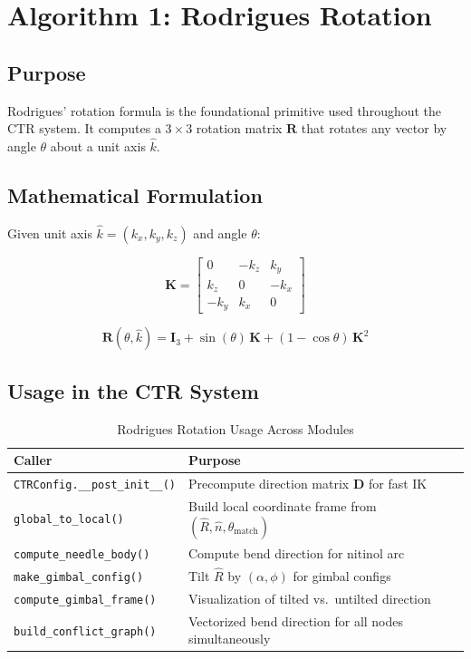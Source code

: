 \documentclass[11pt,a4paper]{article}
\newcommand{\funcname}[1]{\texttt{\textcolor{codepurple}{#1}}}
\begin{document}
\section{Algorithm 1: Rodrigues Rotation}
\label{sec:rodrigues}

\subsection{Purpose}

Rodrigues' rotation formula is the foundational primitive used throughout the CTR system. It computes a $3 \times 3$ rotation matrix $\mathbf{R}$ that rotates any vector by angle $\theta$ about a unit axis $\hat{k}$.

\subsection{Mathematical Formulation}

Given unit axis $\hat{k} = (k_x, k_y, k_z)$ and angle $\theta$:

\[
\mathbf{K} = \begin{bmatrix} 0 & -k_z & k_y \\ k_z & 0 & -k_x \\ -k_y & k_x & 0 \end{bmatrix}
\]

\[
\mathbf{R}(\theta, \hat{k}) = \mathbf{I}_3 + \sin(\theta)\,\mathbf{K} + (1 - \cos\theta)\,\mathbf{K}^2
\]

\subsection{Usage in the CTR System}

\begin{table}[H]
\centering
\caption{Rodrigues Rotation Usage Across Modules}
\begin{tabular}{lp{7cm}}
\toprule
\textbf{Caller} & \textbf{Purpose} \\
\midrule
\funcname{CTRConfig.\_\_post\_init\_\_()} & Precompute direction matrix $\mathbf{D}$ for fast IK \\
\funcname{global\_to\_local()} & Build local coordinate frame from $(\hat{R}, \hat{n}, \theta_\text{match})$ \\
\funcname{compute\_needle\_body()} & Compute bend direction for nitinol arc \\
\funcname{make\_gimbal\_config()} & Tilt $\hat{R}$ by $(\alpha, \phi)$ for gimbal configs \\
\funcname{compute\_gimbal\_frame()} & Visualization of tilted vs.\ untilted direction \\
\funcname{build\_conflict\_graph()} & Vectorized bend direction for all nodes simultaneously \\
\bottomrule
\end{tabular}
\end{table}
\end{document}
